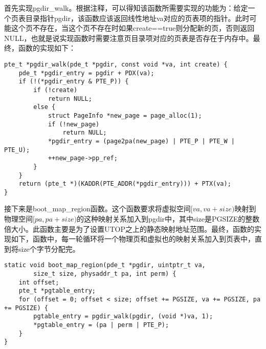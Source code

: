 \begin{exerciseSolution}{4}
    \par 首先实现pgdir\_walk。根据注释，可以得知该函数所需要实现的功能为：给定一个页表目录指针pgdir，该函数应该返回线性地址va对应的页表项的指针。此时可能这个页不存在，当这个页不存在时如果create==true则分配新的页，否则返回NULL，也就是说实现函数时需要注意页目录项对应的页表是否存在于内存中。最终，函数的实现如下：
    \begin{lstlisting}
pte_t *pgdir_walk(pde_t *pgdir, const void *va, int create) {
    pde_t *pgdir_entry = pgdir + PDX(va);
    if (!(*pgdir_entry & PTE_P)) {
        if (!create)
            return NULL;
        else {
            struct PageInfo *new_page = page_alloc(1);
            if (!new_page)
                return NULL;
            *pgdir_entry = (page2pa(new_page) | PTE_P | PTE_W | PTE_U);
            ++new_page->pp_ref;
        }
    }
    return (pte_t *)(KADDR(PTE_ADDR(*pgdir_entry))) + PTX(va);
}
    \end{lstlisting}

    \par 接下来是boot\_map\_region函数。这个函数要求将虚拟空间$[va, va+size)$映射到物理空间$[pa, pa+size)$的这种映射关系加入到pgdir中，其中size是PGSIZE的整数倍大小。此函数主要是为了设置UTOP之上的静态映射地址范围。最终，函数的实现如下，函数中，每一轮循环将一个物理页和虚拟也的映射关系加入到页表中，直到将size个字节分配完。
    \begin{lstlisting}
static void boot_map_region(pde_t *pgdir, uintptr_t va,
        size_t size, physaddr_t pa, int perm) {
    int offset;
    pte_t *pgtable_entry;
    for (offset = 0; offset < size; offset += PGSIZE, va += PGSIZE, pa += PGSIZE) {
        pgtable_entry = pgdir_walk(pgdir, (void *)va, 1);
        *pgtable_entry = (pa | perm | PTE_P);
    }
}
    \end{lstlisting}


\end{exerciseSolution}
